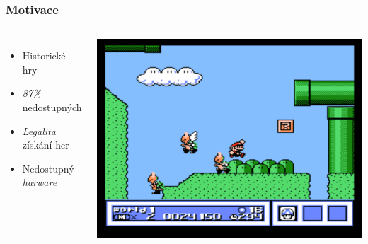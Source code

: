 




\begin{frame}
  \frametitle{Motivace}
  \begin{columns}
    \begin{itemize}
        \item Historické hry
        \item \emph{87\%} nedostupných
        \item \emph{Legalita} získání her
        \item Nedostupný \emph{harware}
    \end{itemize}
     
    \includegraphics[width=\textwidth]{img/smb3.png}
  \end{columns}
\end{frame}


